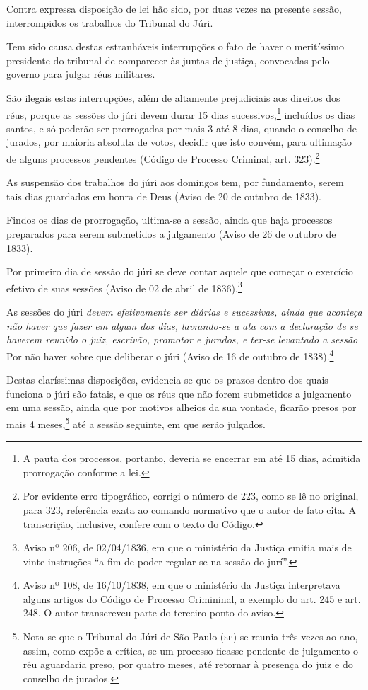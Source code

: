 Contra expressa disposição de lei hão sido, por duas vezes na presente
sessão, interrompidos os trabalhos do Tribunal do Júri.

Tem sido causa destas estranháveis interrupções o fato de haver o
meritíssimo presidente do tribunal de comparecer às juntas de justiça,
convocadas pelo governo para julgar réus militares.

São ilegais estas interrupções, além de altamente prejudiciais aos
direitos dos réus, porque as sessões do júri devem durar 15 dias
sucessivos,\footnote{A pauta dos processos, portanto, deveria se
  encerrar em até 15 dias, admitida prorrogação conforme a lei.}
incluídos os dias santos, e só poderão ser prorrogadas por mais 3 até 8
dias, quando o conselho de jurados, por maioria absoluta de votos,
decidir que isto convém, para ultimação de alguns processos pendentes
(Código de Processo Criminal, art. 323).\footnote{Por evidente erro
  tipográfico, corrigi o número de 223, como se lê no original, para
  323, referência exata ao comando normativo que o autor de fato cita. A
  transcrição, inclusive, confere com o texto do Código.}

As suspensão dos trabalhos do júri aos domingos tem, por fundamento,
serem tais dias guardados em honra de Deus (Aviso de 20 de outubro de
1833).

Findos os dias de prorrogação, ultima-se a sessão, ainda que haja
processos preparados para serem submetidos a julgamento (Aviso de 26 de
outubro de 1833).

Por primeiro dia de sessão do júri se deve contar aquele que começar o
exercício efetivo de suas sessões (Aviso de 02 de abril de
1836).\footnote{Aviso nº 206, de 02/04/1836, em que o ministério da
  Justiça emitia mais de vinte instruções ``a fim de poder regular-se na
  sessão do jurí''.}

As sessões do júri \emph{devem efetivamente ser diárias e sucessivas,
ainda que aconteça não haver que fazer em algum dos dias, lavrando-se a
ata com a declaração de se haverem reunido o juiz, escrivão, promotor e
jurados, e ter-se levantado a sessão} Por não haver sobre que deliberar
o júri (Aviso de 16 de outubro de 1838).\footnote{Aviso nº 108, de
  16/10/1838, em que o ministério da Justiça interpretava alguns artigos
  do Código de Processo Crimininal, a exemplo do art. 245 e art. 248. O
  autor transcreveu parte do terceiro ponto do aviso.}

Destas claríssimas disposições, evidencia-se que os prazos dentro dos
quais funciona o júri são fatais, e que os réus que não forem submetidos
a julgamento em uma sessão, ainda que por motivos alheios da sua
vontade, ficarão presos por mais 4 meses,\footnote{Nota-se que o
  Tribunal do Júri de São Paulo (\textsc{sp}) se reunia três vezes ao ano, assim,
  como expõe a crítica, se um processo ficasse pendente de julgamento o
  réu aguardaria preso, por quatro meses, até retornar à presença do
  juiz e do conselho de jurados.} até a sessão seguinte, em que serão
julgados.

